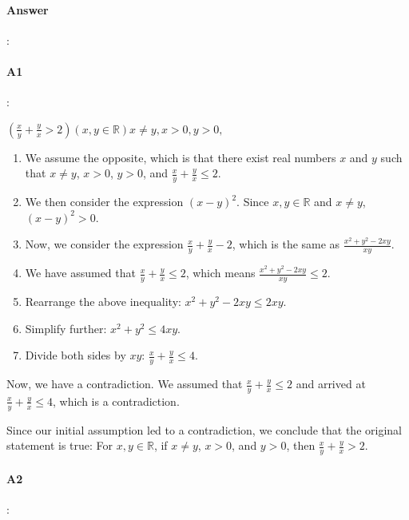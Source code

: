 \documentclass{article}
\begin{document}
\paragraph{Answer}:

\paragraph{A1}:

$(\frac{x}{y} + \frac{y}{x} > 2) (x,y \in \mathbb{R}) x \neq y, x>0, y>0, $
  
\begin{enumerate}
  \item We assume the opposite, which is that there exist real numbers $x$ and $y$ such that $x \neq y$, $x > 0$, $y > 0$, and $\frac{x}{y} + \frac{y}{x} \leq 2$.

  \item We then consider the expression $(x - y)^2$. Since $x,y \in \mathbb{R}$ and $x \neq y$, $(x - y)^2 > 0$.
  
  \item Now, we consider the expression $\frac{x}{y} + \frac{y}{x} - 2$, which is the same as $\frac{x^2 + y^2 - 2xy}{xy}$.
  
  \item We have assumed that $\frac{x}{y} + \frac{y}{x} \leq 2$, which means $\frac{x^2 + y^2 - 2xy}{xy} \leq 2$.
  
  \item Rearrange the above inequality: $x^2 + y^2 - 2xy \leq 2xy$.
  
  \item Simplify further: $x^2 + y^2 \leq 4xy$.
  
  \item Divide both sides by $xy$: $\frac{x}{y} + \frac{y}{x} \leq 4$.
\end{enumerate}


Now, we have a contradiction. We assumed that $\frac{x}{y} + \frac{y}{x} \leq 2$ and arrived at $\frac{x}{y} + \frac{y}{x} \leq 4$, which is a contradiction.

Since our initial assumption led to a contradiction, we conclude that the original statement is true: For $x,y \in \mathbb{R}$, if $x \neq y$, $x > 0$, and $y > 0$, then $\frac{x}{y} + \frac{y}{x} > 2$.

\paragraph{A2}:
\end{document}
